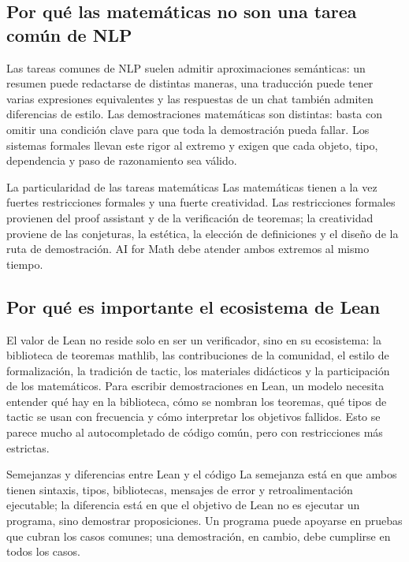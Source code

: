 \documentclass[a4paper]{article}
\begin{document}
\subsection{Por qué las matemáticas no son una tarea común de NLP}

Las tareas comunes de NLP suelen admitir aproximaciones semánticas: un resumen puede redactarse de distintas maneras, una traducción puede tener varias expresiones equivalentes y las respuestas de un chat también admiten diferencias de estilo. Las demostraciones matemáticas son distintas: basta con omitir una condición clave para que toda la demostración pueda fallar. Los sistemas formales llevan este rigor al extremo y exigen que cada objeto, tipo, dependencia y paso de razonamiento sea válido.

\begin{importantbox}{La particularidad de las tareas matemáticas}
Las matemáticas tienen a la vez fuertes restricciones formales y una fuerte creatividad. Las restricciones formales provienen del proof assistant y de la verificación de teoremas; la creatividad proviene de las conjeturas, la estética, la elección de definiciones y el diseño de la ruta de demostración. AI for Math debe atender ambos extremos al mismo tiempo.
\end{importantbox}

\subsection{Por qué es importante el ecosistema de Lean}

El valor de Lean no reside solo en ser un verificador, sino en su ecosistema: la biblioteca de teoremas mathlib, las contribuciones de la comunidad, el estilo de formalización, la tradición de tactic, los materiales didácticos y la participación de los matemáticos. Para escribir demostraciones en Lean, un modelo necesita entender qué hay en la biblioteca, cómo se nombran los teoremas, qué tipos de tactic se usan con frecuencia y cómo interpretar los objetivos fallidos. Esto se parece mucho al autocompletado de código común, pero con restricciones más estrictas.

\begin{knowledgebox}{Semejanzas y diferencias entre Lean y el código}
La semejanza está en que ambos tienen sintaxis, tipos, bibliotecas, mensajes de error y retroalimentación ejecutable; la diferencia está en que el objetivo de Lean no es ejecutar un programa, sino demostrar proposiciones. Un programa puede apoyarse en pruebas que cubran los casos comunes; una demostración, en cambio, debe cumplirse en todos los casos.
\end{knowledgebox}
\end{document}
